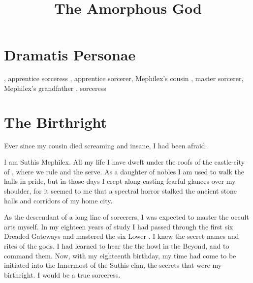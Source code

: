 \documentclass
  [a4paper,
   12pt,
   oneside
  ]%
  {article}
\title{The Amorphous God}
\begin{document}
  \stuffatthebeginning
  \setcounter{page}{1}















\section*{Dramatis Personae}
\begin{dramatispersonae}
  , 
    apprentice sorceress
  , 
    apprentice sorcerer, Mephilex's cousin
  , 
    master sorcerer, Mephilex's grandfather
  , 
    sorceress
\end{dramatispersonae}















\section{The Birthright}
Ever since my cousin died screaming and insane, I had been afraid. 

I am Suthis Mephilex. 
All my life I have dwelt under the roofs of the castle-city of \Yormis, where we \scathae rule and the \humans serve.%
\index{\human}%
\index{\scatha}%
\index{\Yormis}
As a daughter of nobles I am used to walk the halls in pride, but in those days I crept along casting fearful glances over my shoulder, for it seemed to me that a spectral horror stalked the ancient stone halls and corridors of my home city. 

As the descendant of a long line of \rethyax sorcerers, I was expected to master the occult arts myself. 
In my eighteen years of study I had passed through the first six Dreaded Gateways and mastered the six Lower \Arcana. 
I knew the secret names and rites of the gods. 
I had learned to hear the the \daemons howl in the Beyond, and to command them.%
\index{\daemon}
Now, with my eighteenth birthday, my time had come to be initiated into the Innermost \Arcana of the Suthis clan, the secrets that were my birthright. 
I would be a true \rethyax sorceress.
\end{document}
